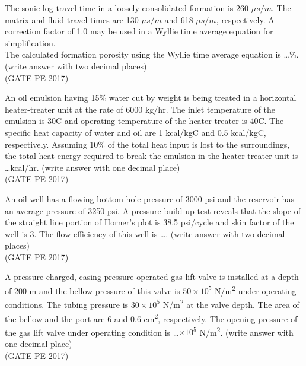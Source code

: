 \documentclass[journal,12pt,onecolumn]{IEEEtran}
\theoremstyle{remark}
\begin{document}
\begin{enumerate}
{\item The sonic log travel time in a loosely consolidated formation is 260 $\mu s/m$. The matrix and fluid travel times are 130 $\mu s/m$ and 618 $\mu s/m$, respectively. A correction factor of 1.0 may be used in a Wyllie time average equation for simplification.\\[1ex]
The calculated formation porosity using the Wyllie time average equation is \dots \%. (write answer with two decimal places)\\

\hfill{(GATE PE 2017)}

\item An oil emulsion having 15\% water cut by weight is being treated in a horizontal heater-treater unit at the rate of 6000 kg/hr. The inlet temperature of the emulsion is 30\textdegree C and operating temperature of the heater-treater is 40\textdegree C. The specific heat capacity of water and oil are 1 kcal/kg\textdegree C and 0.5 kcal/kg\textdegree C, respectively. Assuming 10\% of the total heat input is lost to the surroundings, the total heat energy required to break the emulsion in the heater-treater unit is \dots kcal/hr. (write answer with one decimal place)\\

\hfill{(GATE PE 2017)}

\item An oil well has a flowing bottom hole pressure of 3000 psi and the reservoir has an average pressure of 3250 psi. A pressure build-up test reveals that the slope of the straight line portion of Horner's plot is 38.5 psi/cycle and skin factor of the well is 3. The flow efficiency of this well is \dots. (write answer with two decimal places)\\

\hfill{(GATE PE 2017)}


\item A pressure charged, casing pressure operated gas lift valve is installed at a depth of 200 m and the bellow pressure of this valve is $50 \times 10^5$ N/m\textsuperscript{2} under operating conditions. The tubing pressure is $30 \times 10^5$ N/m\textsuperscript{2} at the valve depth. The area of the bellow and the port are 6 and 0.6 cm\textsuperscript{2}, respectively. The opening pressure of the gas lift valve under operating condition is \dots $\times 10^5$ N/m\textsuperscript{2}. (write answer with one decimal place)\\

\hfill{(GATE PE 2017)}

}
\end{enumerate}
\end{document}
